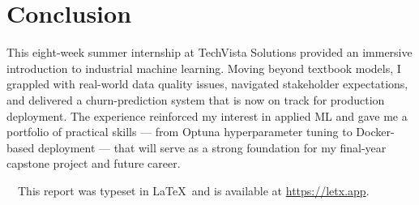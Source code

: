\section{Conclusion}

This eight-week summer internship at TechVista Solutions provided an immersive
introduction to industrial machine learning. Moving beyond textbook models, I
grappled with real-world data quality issues, navigated stakeholder expectations,
and delivered a churn-prediction system that is now on track for production
deployment. The experience reinforced my interest in applied ML and gave me a
portfolio of practical skills --- from Optuna hyperparameter tuning to Docker-based
deployment --- that will serve as a strong foundation for my final-year capstone
project and future career.

\vspace{10pt}
{\small\color{rulecolor}\faFilePdf\ \ This report was typeset in \LaTeX\ and is
available at \url{https://letx.app}.}
